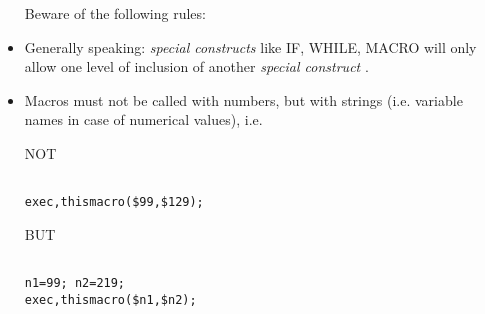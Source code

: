 \begin{itemize}
Beware of the following rules:

	\item Generally speaking: \textit{ special constructs } like IF, WHILE,
MACRO will only allow one level of inclusion of another \textit{
special construct }.

	\item  Macros must not be called with numbers, but with strings
(i.e. variable names in case of numerical values), i.e. 



NOT

\begin{verbatim}

exec,thismacro($99,$129);
\end{verbatim}
BUT

\begin{verbatim}

n1=99; n2=219;
exec,thismacro($n1,$n2);
\end{verbatim}

\end{itemize}


